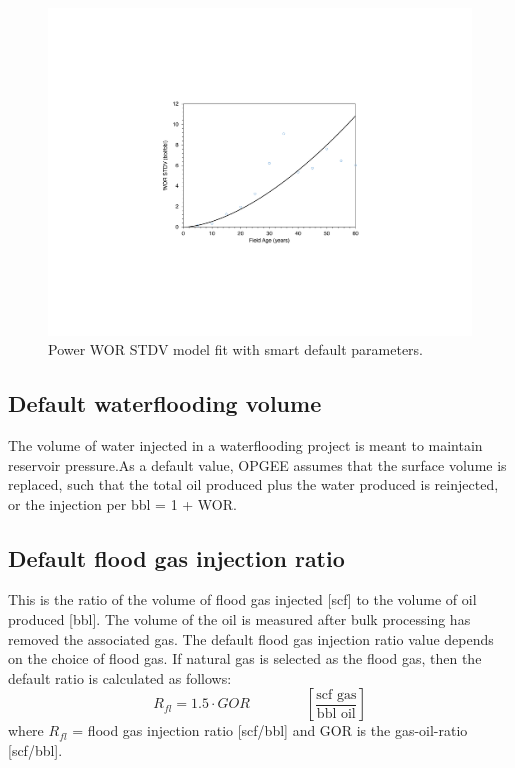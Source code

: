\documentclass[11pt]{report}
\newcommand{\eqnunitfrac}[2]{\quad\quad \scriptstyle{\left[\frac{\text{#1}}{\text{#2}}\right]}}
\begin{document}
\begin{figure}
\includegraphics[width=1\columnwidth]{images/WOR_STDV.pdf}
\caption{Power WOR STDV model fit with smart default parameters. }
\label{fig:WOR_STDV}
\end{figure}


\subsection{Default waterflooding volume}

The volume of water injected in a waterflooding project is meant to maintain reservoir pressure.As a default value, OPGEE assumes that the surface volume is replaced, such that the total oil produced plus the water produced is reinjected, or the injection per bbl = 1 + WOR.

\subsection{Default flood gas injection ratio}

This is the ratio of the volume of flood gas injected [scf] to the volume of oil produced [bbl]. The volume of the oil is measured after bulk processing has removed the associated gas. The default flood gas injection ratio value depends on the choice of flood gas. If natural gas is selected as the flood gas, then the default ratio is calculated as follows:
\begin{equation}\label{eq:NaturalGasAirOxygenFloodGasRatio}
R_{fl}=1.5\cdot GOR \quad\quad\eqnunitfrac{scf gas}{bbl oil}
\end{equation}
where $R_{fl}$ = flood gas injection ratio [scf/bbl] and GOR is the gas-oil-ratio [scf/bbl].
\end{document}

